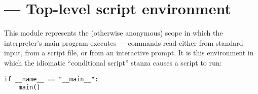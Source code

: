 \section{ ---
         Top-level script environment}


This module represents the (otherwise anonymous) scope in which the
interpreter's main program executes --- commands read either from
standard input, from a script file, or from an interactive prompt.  It
is this environment in which the idiomatic ``conditional script''
stanza causes a script to run:

\begin{verbatim}
if __name__ == "__main__":
    main()
\end{verbatim}

